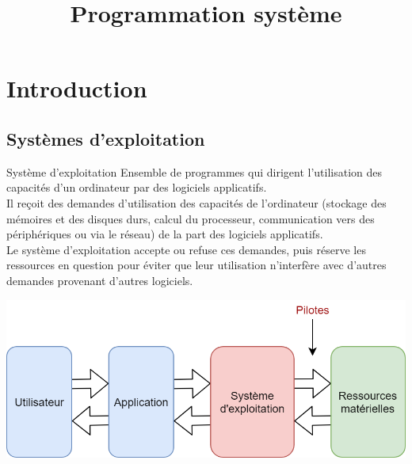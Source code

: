 
\usepackage{myInfolines}
\usepackage{longtable,array}
\title{Programmation système}




	\begin{frame}
		\titlepage
	\end{frame}
	
	\begin{frame}
		\tableofcontents
	\end{frame}
	
	\section{Introduction}
	\subsection{Systèmes d'exploitation}
		\begin{frame}
			\begin{block}{Système d'exploitation}
			Ensemble de programmes qui dirigent l'utilisation des capacités d’un ordinateur par des logiciels applicatifs.\\
			Il reçoit des demandes d'utilisation des capacités de l'ordinateur (stockage des mémoires et des disques durs, calcul du processeur, communication vers des périphériques ou via le réseau) de la part des logiciels applicatifs.\\
			Le système d'exploitation accepte ou refuse ces demandes, puis réserve les ressources en question pour éviter que leur utilisation n'interfère avec d'autres demandes provenant d'autres logiciels.
			\end{block}
			
			\begin{center}\includegraphics[scale=0.3]{img/SE.png}\end{center}
		\end{frame}
		
